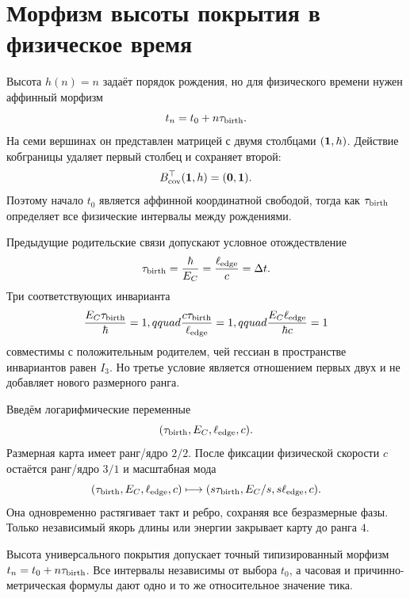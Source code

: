 \chapter{Морфизм высоты покрытия в физическое время}
\label{ch:v10-nonequilibrium-bath-cover-height-physical-time}

Высота $h(n)=n$ задаёт порядок рождения, но для физического времени нужен
аффинный морфизм
\begin{equation}
 t_n=t_0+n\tau_{\rm birth}.
\end{equation}
На семи вершинах он представлен матрицей с двумя столбцами
$({\bf1},h)$. Действие кобграницы удаляет первый столбец и сохраняет второй:
\begin{equation}
 B_{\rm cov}^{\top}({\bf1},h)=({\bf0},{\bf1}).
\end{equation}
Поэтому начало $t_0$ является аффинной координатной свободой, тогда как
$\tau_{\rm birth}$ определяет все физические интервалы между рождениями.

Предыдущие родительские связи допускают условное отождествление
\begin{equation}
 \tau_{\rm birth}=\frac{\hbar}{E_C}
 =\frac{\ell_{\rm edge}}{c}=\Delta t.
\end{equation}
Три соответствующих инварианта
\begin{equation}
 \frac{E_C\tau_{\rm birth}}{\hbar}=1,qquad
 \frac{c\tau_{\rm birth}}{\ell_{\rm edge}}=1,qquad
 \frac{E_C\ell_{\rm edge}}{\hbar c}=1
\end{equation}
совместимы с положительным родителем, чей гессиан в пространстве инвариантов
равен $I_3$. Но третье условие является отношением первых двух и не добавляет
нового размерного ранга.

Введём логарифмические переменные
\begin{equation}
 (\tau_{\rm birth},E_C,\ell_{\rm edge},c).
\end{equation}
Размерная карта имеет ранг/ядро $2/2$. После фиксации физической скорости
$c$ остаётся ранг/ядро $3/1$ и масштабная мода
\begin{equation}
 (\tau_{\rm birth},E_C,\ell_{\rm edge},c)
 \longmapsto (s\tau_{\rm birth},E_C/s,s\ell_{\rm edge},c).
\end{equation}
Она одновременно растягивает такт и ребро, сохраняя все безразмерные фазы.
Только независимый якорь длины или энергии закрывает карту до ранга $4$.

\begin{theorem}
Высота универсального покрытия допускает точный типизированный морфизм
$t_n=t_0+n\tau_{\rm birth}$. Все интервалы независимы от выбора $t_0$, а
часовая и причинно-метрическая формулы дают одно и то же относительное
значение тика.
\end{theorem}

